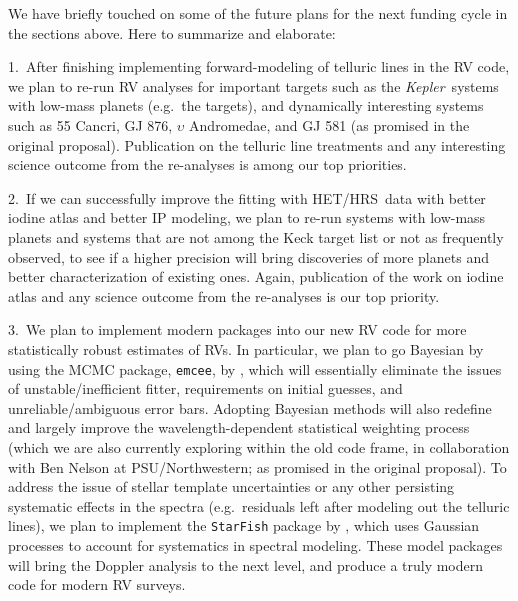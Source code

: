 \documentclass[12pt]{article}
\def\kepler{{\it Kepler}}
\def\hrs{HET/HRS}
\begin{document}
We have briefly touched on some of the future plans for the next
funding cycle in the sections above. Here to summarize and elaborate:

1.\ After finishing implementing forward-modeling of telluric lines in
the RV code, we plan to re-run RV analyses for important targets such
as the \kepler\ systems with low-mass planets (e.g.\ the
\citealt{Marcy2014} targets), and dynamically interesting systems such
as 55 Cancri, GJ 876, $\upsilon$ Andromedae, and GJ 581 (as promised
in the original proposal). Publication on the telluric line treatments
and any interesting science outcome from the re-analyses is among our
top priorities.

2.\ If we can successfully improve the fitting with \hrs\ data with
better iodine atlas and better IP modeling, we plan to re-run systems
with low-mass planets and systems that are not among the Keck target
list or not as frequently observed, to see if a higher precision will
bring discoveries of more planets and better characterization of
existing ones. Again, publication of the work on iodine atlas and any
science outcome from the re-analyses is our top priority.

3.\ We plan to implement modern packages into our new RV code for more
statistically robust estimates of RVs. In particular, we plan to go
Bayesian by using the MCMC package, {\tt emcee}, by \cite{emcee},
which will essentially eliminate the issues of unstable/inefficient
fitter, requirements on initial guesses, and unreliable/ambiguous
error bars. Adopting Bayesian methods will also redefine and largely
improve the wavelength-dependent statistical weighting process (which
we are also currently exploring within the old code frame, in
collaboration with Ben Nelson at PSU/Northwestern; as promised in the original
proposal). To address the issue of stellar template uncertainties or
any other persisting systematic effects in the spectra
(e.g.\ residuals left after modeling out the telluric lines), we plan
to implement the {\tt StarFish} package by \cite{starfish}, which uses
Gaussian processes to account for systematics in spectral
modeling. These model packages will bring the Doppler analysis to the
next level, and produce a truly modern code for modern RV surveys.



\vspace{-3pt}
{\small %
 }


\end{document}
